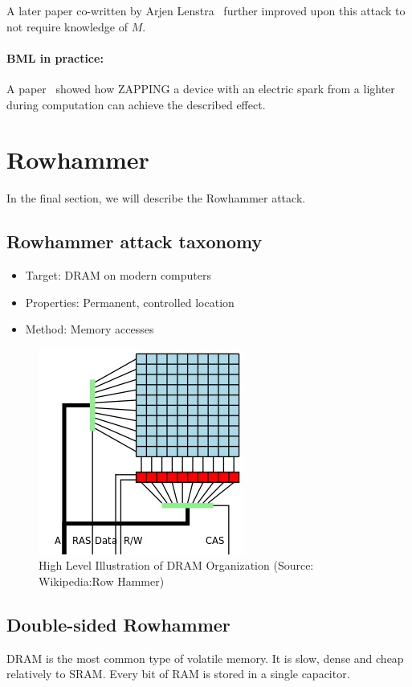 A later paper co-written by Arjen Lenstra~\cite{lenstra} further improved upon this attack to not require knowledge of \(M\).

\paragraph{BML in practice:} A paper~\cite{schmidt} showed how ZAPPING a device with an electric spark from a lighter during computation can achieve the described effect.

\section{Rowhammer}\label{sec:rowhammer}
In the final section, we will describe the Rowhammer attack.
\subsection{Rowhammer attack taxonomy}\label{subsec:rowhammer_attack_taxonomy}
	\begin{itemize}
		\item Target: DRAM on modern computers
		\item Properties: Permanent, controlled location
		\item Method: Memory accesses
	\end{itemize}

\begin{figure}[!ht]
	\centering
	\includegraphics[width=0.5\linewidth]{images/chapter_9/DRAM.jpg}
	\caption{High Level Illustration of DRAM Organization (Source: Wikipedia:Row Hammer)}\label{fig:dram_svg}
\end{figure}

\subsection{Double-sided Rowhammer}\label{subsec:double_sided_rowhammer}
DRAM is the most common type of volatile memory. It is slow, dense and cheap relatively to SRAM\@. Every bit of RAM is stored in a single capacitor.

